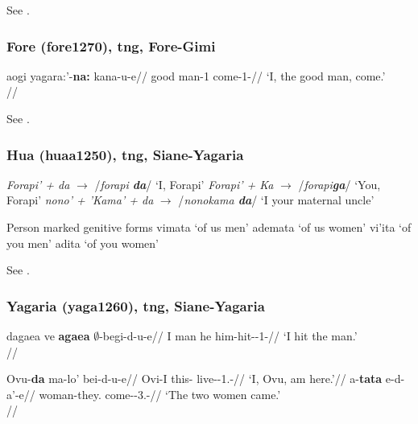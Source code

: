 See \citet[90--92, 96f.]{bruce1984}.

\subsubsection{Fore (fore1270), \gls{tng}, Fore-Gimi}


\ex
\begingl
\gla aogi yagara:'-\textbf{na:} kana-u-e//
\glb good man-1\Sg{} come-1\Sg-\Ind{}//
\glft `I, the good man, come.'\\{\citep[after][80]{scott1978}}//
\endgl
\xe

See \citet[79f., 100f.]{scott1978}.

\subsubsection{Hua (huaa1250), \gls{tng}, Siane-Yagaria}

\pex 
\a
\emph{Forapi' + da} $\rightarrow$ /\emph{forapi \textbf{da}}/ `I, Forapi'
\a
\emph{Forapi' + Ka} $\rightarrow$ /\emph{forapi\textbf{ga}}/ `You, Forapi'
\a
\emph{nono' + 'Kama' + da} $\rightarrow$ /\emph{nonokama \textbf{da}}/ `I your maternal uncle'\\{\citep[226]{haiman1980}}
\xe

\pex Person marked genitive forms{\citep[after][240]{haiman1980}}
\a vimata \newline`of us men'
\a ademata \newline `of us women'
\a vi'ita \newline `of you men'
\a adita \newline `of you women'
\xe

See \citet[226--232, 239f.]{haiman1980}.

\subsubsection{Yagaria (yaga1260), \gls{tng}, Siane-Yagaria}

\ex 
\begingl
\gla dagaea ve \textbf{agaea} $\emptyset$-begi-d-u-e//
\glb I man he him-hit-\Pst{}-1\Sg{}-\Ind{}//
\glft `I hit the man.' \\{\citep[18f.]{renck1975}}//
\endgl
\xe

\pex\a
\begingl
\gla Ovu-\textbf{da} ma-lo' bei-d-u-e//
\glb Ovi-I this-\Loc{} live-\Pst{}-1.\Sg{}-\Ind{}//
\glft `I, Ovu, am here.'//
\endgl
\a
\begingl
\gla a-\textbf{tata} e-d-a'-e//
\glb woman-they.\Du{}{} come-\Pst{}-3.\Du{}-\Ind{}//
\glft `The two women came.'\\{\citep[19]{renck1975}}//
\endgl
\xe

